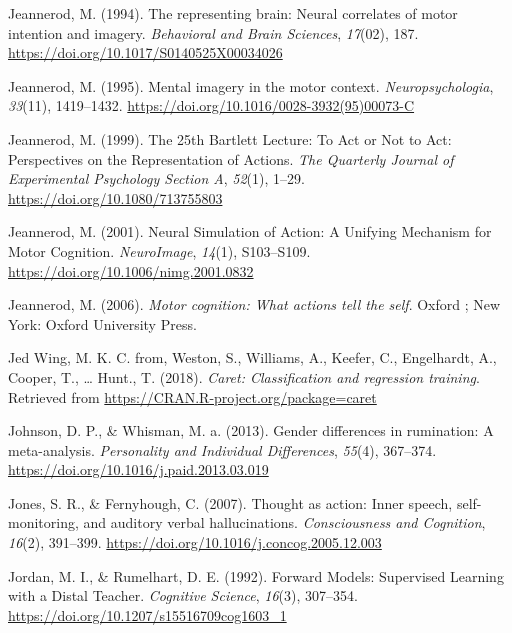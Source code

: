 \documentclass[a4paper,12pt,twoside,openright,oldfontcommands]{memoir}
\begin{document}
\leavevmode\hypertarget{ref-jeannerod_representing_1994}{}%
Jeannerod, M. (1994). The representing brain: Neural correlates of motor intention and imagery. \emph{Behavioral and Brain Sciences}, \emph{17}(02), 187. \url{https://doi.org/10.1017/S0140525X00034026}

\leavevmode\hypertarget{ref-jeannerod_mental_1995}{}%
Jeannerod, M. (1995). Mental imagery in the motor context. \emph{Neuropsychologia}, \emph{33}(11), 1419--1432. \url{https://doi.org/10.1016/0028-3932(95)00073-C}

\leavevmode\hypertarget{ref-jeannerod_25th_1999}{}%
Jeannerod, M. (1999). The 25th Bartlett Lecture: To Act or Not to Act: Perspectives on the Representation of Actions. \emph{The Quarterly Journal of Experimental Psychology Section A}, \emph{52}(1), 1--29. \url{https://doi.org/10.1080/713755803}

\leavevmode\hypertarget{ref-jeannerod_neural_2001}{}%
Jeannerod, M. (2001). Neural Simulation of Action: A Unifying Mechanism for Motor Cognition. \emph{NeuroImage}, \emph{14}(1), S103--S109. \url{https://doi.org/10.1006/nimg.2001.0832}

\leavevmode\hypertarget{ref-jeannerod_motor_2006}{}%
Jeannerod, M. (2006). \emph{Motor cognition: What actions tell the self}. Oxford ; New York: Oxford University Press.

\leavevmode\hypertarget{ref-R-caret}{}%
Jed Wing, M. K. C. from, Weston, S., Williams, A., Keefer, C., Engelhardt, A., Cooper, T., \ldots{} Hunt., T. (2018). \emph{Caret: Classification and regression training}. Retrieved from \url{https://CRAN.R-project.org/package=caret}

\leavevmode\hypertarget{ref-Johnson2013}{}%
Johnson, D. P., \& Whisman, M. a. (2013). Gender differences in rumination: A meta-analysis. \emph{Personality and Individual Differences}, \emph{55}(4), 367--374. \url{https://doi.org/10.1016/j.paid.2013.03.019}

\leavevmode\hypertarget{ref-Jones2007}{}%
Jones, S. R., \& Fernyhough, C. (2007). Thought as action: Inner speech, self-monitoring, and auditory verbal hallucinations. \emph{Consciousness and Cognition}, \emph{16}(2), 391--399. \url{https://doi.org/10.1016/j.concog.2005.12.003}

\leavevmode\hypertarget{ref-jordan_forward_1992}{}%
Jordan, M. I., \& Rumelhart, D. E. (1992). Forward Models: Supervised Learning with a Distal Teacher. \emph{Cognitive Science}, \emph{16}(3), 307--354. \url{https://doi.org/10.1207/s15516709cog1603_1}
\end{document}
